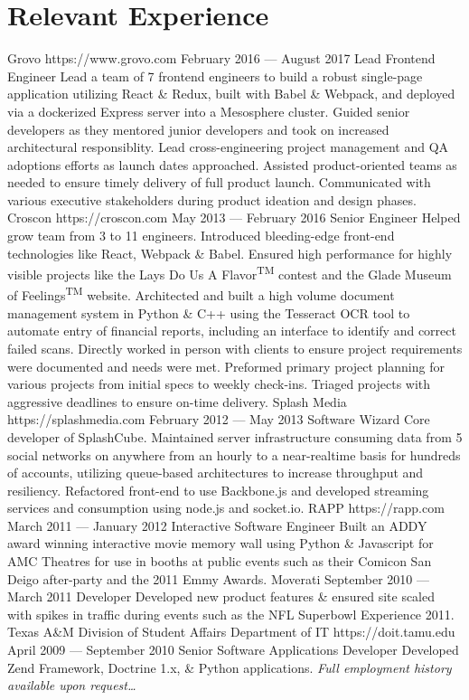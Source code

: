 \documentclass{resume}
\begin{document}
\smallskip

\section{Relevant Experience}

\employer
	{Grovo}
	{https://www.grovo.com}
	{February 2016 --- August 2017}
	{Lead Frontend Engineer}
	{Lead a team of 7 frontend engineers to build a robust single-page application utilizing React \& Redux, built with Babel \& Webpack, and deployed via a dockerized Express server into a Mesosphere cluster. Guided senior developers as they mentored junior developers and took on increased architectural responsiblity. Lead cross-engineering project management and QA adoptions efforts as launch dates approached. Assisted product-oriented teams as needed to ensure timely delivery of full product launch. Communicated with various executive stakeholders during product ideation and design phases.}
\employer
	{Croscon}
	{https://croscon.com}
	{May 2013 --- February 2016}
	{Senior Engineer}
	{Helped grow team from 3 to 11 engineers. Introduced bleeding-edge front-end technologies like React, Webpack \& Babel. Ensured high performance for highly visible projects like the Lays\textsuperscript{\textregistered} Do Us A Flavor\textsuperscript{TM} contest and the Glade\textsuperscript{\textregistered} Museum of Feelings\textsuperscript{TM} website. Architected and built a high volume document management system in Python \& C++ using the Tesseract OCR tool to automate entry of financial reports, including an interface to identify and correct failed scans. Directly worked in person with clients to ensure project requirements were documented and needs were met. Preformed primary project planning for various projects from initial specs to weekly check-ins. Triaged projects with aggressive deadlines to ensure on-time delivery.}
\employer
	{Splash Media}
	{https://splashmedia.com}
	{February 2012 --- May 2013}
	{Software Wizard}
	{Core developer of SplashCube. Maintained server infrastructure consuming data from 5 social networks on anywhere from an hourly to a near-realtime basis for hundreds of accounts, utilizing queue-based architectures to increase throughput and resiliency. Refactored front-end to use Backbone.js and developed streaming services and consumption using node.js and socket.io.}
\employer
	{RAPP}
	{https://rapp.com}
	{March 2011 --- January 2012}
	{Interactive Software Engineer}
	{Built an ADDY award winning interactive movie memory wall using Python \& Javascript for AMC Theatres for use in booths at public events such as their Comicon San Deigo after-party and the 2011 Emmy Awards.}
\employer
	{Moverati}
	{}
	{September 2010 --- March 2011}
	{Developer}
	{Developed new product features \& ensured site scaled with spikes in traffic during events such as the NFL Superbowl Experience 2011.}
\employer
	{Texas A\&M Division of Student Affairs Department of IT}
	{https://doit.tamu.edu}
	{April 2009 --- September 2010}
	{Senior Software Applications Developer}
	{Developed Zend Framework, Doctrine 1.x, \& Python applications.}
\emph{Full employment history available upon request\ldots}
\end{document}
